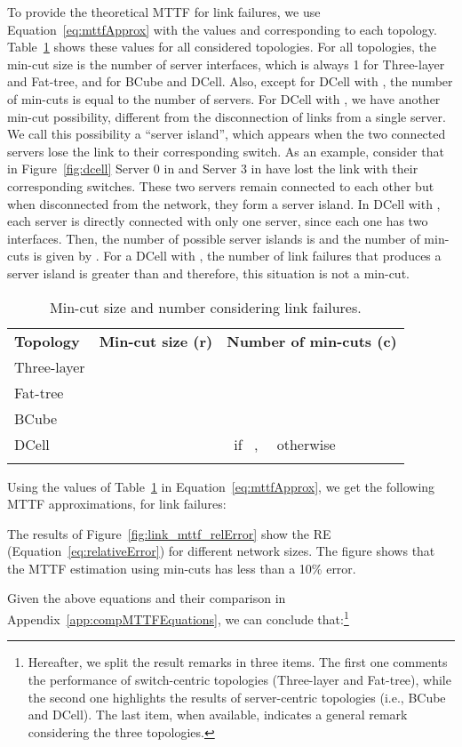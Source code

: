 To provide the theoretical MTTF for link failures, we use Equation~\ref{eq:mttfApprox} with the values  and  corresponding to each topology. Table~\ref{tab:cuts_link} shows these values for all considered topologies. For all topologies, the min-cut size is the number of server interfaces, which is always 1 for Three-layer and Fat-tree, and  for BCube and DCell. Also, except for DCell with , the number of min-cuts is equal to the number of servers. For DCell with , we have another min-cut possibility, different from the disconnection of  links from a single server. We call this possibility a ``server island'', which appears when the two connected servers lose the link to their corresponding switch. 
As an example, consider that in Figure~\ref{fig:dcell} Server 0 in  and Server 3 in  have lost the link with their corresponding switches. These two servers remain connected to each other but when disconnected from the network, they form a server island.
In DCell with , each server is directly connected with only one server, since each one has two interfaces. Then, the number of possible server islands is  and the number of min-cuts is given by . For a DCell with , the number of link failures that produces a server island is greater than  and therefore, this situation is not a min-cut.
\begin{table}
\caption{Min-cut size and number considering link failures.}
\label{tab:cuts_link}
\begin{tabular}{lll}
\hline\noalign{\smallskip}
\hline \textbf{Topology}			&\textbf{Min-cut size (r)} &\textbf{Number of min-cuts (c)}\\
\noalign{\smallskip}\hline\noalign{\smallskip}
Three-layer	& &\\
Fat-tree & & \\
BCube & & \\
DCell & & \ if \,  , \,  \, otherwise\\
\noalign{\smallskip}\hline
\end{tabular}
\end{table}

Using the values of Table~\ref{tab:cuts_link} in Equation~\ref{eq:mttfApprox}, we get the following MTTF approximations, for link failures:




The results of Figure~\ref{fig:link_mttf_relError} show the RE (Equation~\ref{eq:relativeError}) for different network sizes. The figure shows that the MTTF estimation using min-cuts has less than a 10\% error.

Given the above equations and their comparison in Appendix~\ref{app:compMTTFEquations}, we can conclude that:\footnote{Hereafter, we split the result remarks in three items. The first one comments the performance of switch-centric topologies (Three-layer and Fat-tree), while the second one highlights the results of server-centric topologies (i.e., BCube and DCell). The last item, when available, indicates a general remark considering the three topologies.}

